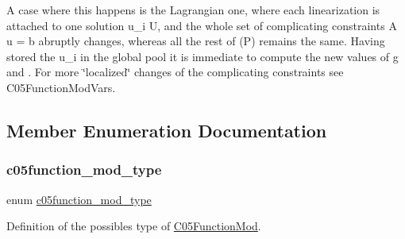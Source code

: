 A case where this happens is the Lagrangian one, where each linearization is attached to one solution u\+\_\+i  U, and the whole set of complicating constraints A u = b abruptly changes, whereas all the rest of (P) remains the same. Having stored the u\+\_\+i in the global pool it is immediate to compute the new values of g and . For more \char`\"{}localized\char`\"{} changes of the complicating constraints see C05\+Function\+Mod\+Vars. 

\subsection{Member Enumeration Documentation}
\mbox{\label{class_s_m_spp__di__unipi__it_1_1_c05_function_mod_abf764a6c8b2a7afb378f1c4d9897fb97}} 
\subsubsection{\texorpdfstring{c05function\+\_\+mod\+\_\+type}{c05function\_mod\_type}}
{\footnotesize\ttfamily enum \mbox{\hyperlink{class_s_m_spp__di__unipi__it_1_1_c05_function_mod_abf764a6c8b2a7afb378f1c4d9897fb97}{c05function\+\_\+mod\+\_\+type}}}



Definition of the possibles type of \mbox{\hyperlink{class_s_m_spp__di__unipi__it_1_1_c05_function_mod}{C05\+Function\+Mod}}. 

